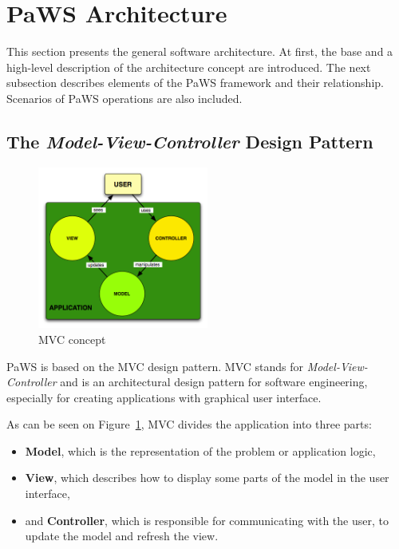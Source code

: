 \section{PaWS Architecture}

This section presents the general software architecture. At first, the
base and a high-level description of the architecture concept are
introduced. The next subsection describes elements of the PaWS framework
and their relationship. Scenarios of PaWS operations are also included.

\subsection{The \emph{Model-View-Controller} Design Pattern}
\label{mvc}

\begin{figure}[h!]
  \centering
  \includegraphics[width=0.5\textwidth]{reportCh2/mvc}
  \caption{MVC concept\cite{mvc_for_php}}
  \label{fig:mvc}
\end{figure}

PaWS is based on the MVC\cite{mvc} design pattern. MVC stands for
\emph{Model-View-Controller} and is an architectural design pattern
for software engineering, especially for creating applications with
graphical user interface.

As can be seen on Figure~\ref{fig:mvc}, MVC divides the application
into three parts:
\begin{itemize}

\item {\bf Model}, which is the representation of the problem or
  application logic,

\item {\bf View}, which describes how to display some parts of the model
  in the user interface,

\item and {\bf Controller}, which is responsible for communicating
  with the user, to update the model and refresh the view.

\end{itemize}

